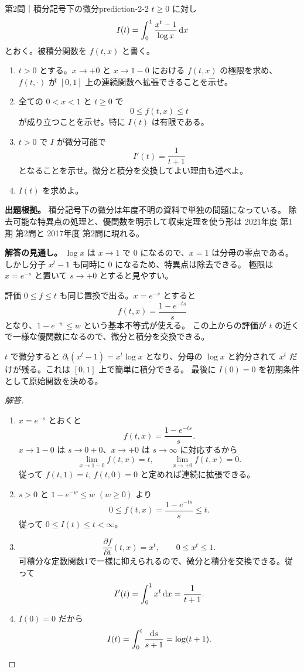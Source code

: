 \begin{problem}{第2問｜積分記号下の微分}{prediction-2-2}
$t\ge0$ に対し
\[
I(t)=\int_0^1\frac{x^t-1}{\log x}\,\mathrm{d} x
\]
とおく。被積分関数を $f(t,x)$ と書く。
\begin{enumerate}
  \item[(1)] $t>0$ とする。$x\to+0$ と $x\to1-0$ における $f(t,x)$ の極限を求め、
  $f(t,\cdot)$ が $[0,1]$ 上の連続関数へ拡張できることを示せ。
  \item[(2)] 全ての $0<x<1$ と $t\ge0$ で
  \[
  0\le f(t,x)\le t
  \]
  が成り立つことを示せ。特に $I(t)$ は有限である。
  \item[(3)] $t>0$ で $I$ が微分可能で
  \[
  I'(t)=\frac1{t+1}
  \]
  となることを示せ。微分と積分を交換してよい理由も述べよ。
  \item[(4)] $I(t)$ を求めよ。
\end{enumerate}
\end{problem}
\begin{memo*}
\textbf{出題根拠。}
積分記号下の微分は年度不明の資料で単独の問題になっている。
除去可能な特異点の処理と、優関数を明示して収束定理を使う形は
2021年度 第1期 第2問と 2017年度 第2問に現れる。

\textbf{解答の見通し。}
$\log x$ は $x\to1$ で $0$ になるので、$x=1$ は分母の零点である。
しかし分子 $x^t-1$ も同時に $0$ になるため、特異点は除去できる。
極限は $x=e^{-s}$ と置いて $s\to+0$ とすると見やすい。

評価 $0\le f\le t$ も同じ置換で出る。$x=e^{-s}$ とすると
\[
f(t,x)=\frac{1-e^{-ts}}{s}
\]
となり、$1-e^{-w}\le w$ という基本不等式が使える。
この上からの評価が $t$ の近くで一様な優関数になるので、微分と積分を交換できる。

$t$ で微分すると $\partial_t(x^t-1)=x^t\log x$ となり、分母の $\log x$ と約分されて
$x^t$ だけが残る。これは $[0,1]$ 上で簡単に積分できる。
最後に $I(0)=0$ を初期条件として原始関数を決める。
\end{memo*}
\begin{proof}[解答]
\begin{enumerate}
  \item[(1)] $x=e^{-s}$ とおくと
  \[
  f(t,x)=\frac{1-e^{-ts}}s.
  \]
  $x\to1-0$ は $s\to0+0$、$x\to+0$ は $s\to\infty$ に対応するから
  \[
  \lim_{x\to1-0}f(t,x)=t,\qquad
  \lim_{x\to+0}f(t,x)=0.
  \]
  従って $f(t,1)=t$, $f(t,0)=0$ と定めれば連続に拡張できる。

  \item[(2)] $s>0$ と $1-e^{-w}\le w$ $(w\ge0)$ より
  \[
  0\le f(t,x)=\frac{1-e^{-ts}}s\le t.
  \]
  従って $0\le I(t)\le t<\infty$。

  \item[(3)]
  \[
  \frac{\partial f}{\partial t}(t,x)=x^t,\qquad 0\le x^t\le1.
  \]
  可積分な定数関数1で一様に抑えられるので、微分と積分を交換できる。従って
  \[
  I'(t)=\int_0^1x^t\,\mathrm{d} x=\frac1{t+1}.
  \]

  \item[(4)] $I(0)=0$ だから
  \[
  I(t)=\int_0^t\frac{\mathrm{d} s}{s+1}=\log(t+1).
  \]
\end{enumerate}
\end{proof}

